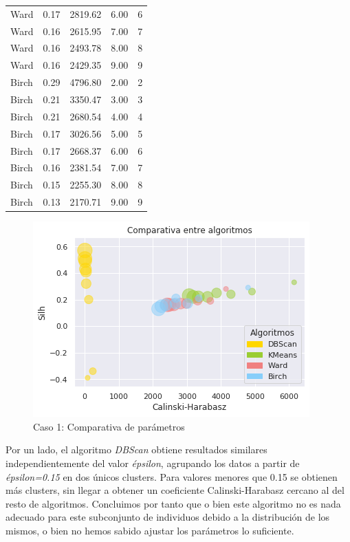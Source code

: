 \documentclass[11pt,a4paper]{article}
\begin{document}
\begin{table}[]
\begin{tabular}{lllll}
			Ward      & 0.17  & 2819.62           & 6.00       & 6           \\
			Ward      & 0.16  & 2615.95           & 7.00       & 7           \\
			Ward      & 0.16  & 2493.78           & 8.00       & 8           \\
			Ward      & 0.16  & 2429.35           & 9.00       & 9           \\
			Birch     & 0.29  & 4796.80           & 2.00       & 2           \\
			Birch     & 0.21  & 3350.47           & 3.00       & 3           \\
			Birch     & 0.21  & 2680.54           & 4.00       & 4           \\
			Birch     & 0.17  & 3026.56           & 5.00       & 5           \\
			Birch     & 0.17  & 2668.37           & 6.00       & 6           \\
			Birch     & 0.16  & 2381.54           & 7.00       & 7           \\
			Birch     & 0.15  & 2255.30           & 8.00       & 8           \\
			Birch     & 0.13  & 2170.71           & 9.00       & 9          
		\end{tabular}
	\end{table}
	
	\begin{figure}[] 
		\centering
		\includegraphics[scale=0.9]{../Caso1/bubbles}
		\caption{Caso 1: Comparativa de parámetros} \label{bubbles1}
	\end{figure}

	Por un lado, el algoritmo \emph{DBScan} obtiene resultados similares independientemente del valor \emph{épsilon}, agrupando los datos a partir de \textit{épsilon=0.15} en dos únicos clusters. Para valores menores que 0.15 se obtienen más clusters, sin llegar a obtener un coeficiente Calinski-Harabasz cercano al del resto de algoritmos. Concluimos por tanto que o bien este algoritmo no es nada adecuado para este subconjunto de individuos debido a la distribución de los mismos, o bien no hemos sabido ajustar los parámetros lo suficiente. \\
\end{document}

